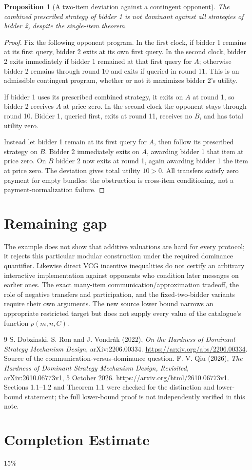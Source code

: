 \documentclass[11pt]{article}
\newtheorem{proposition}[theorem]{Proposition}
\theoremstyle{definition}
\theoremstyle{remark}
\begin{document}
\begin{proposition}[A two-item deviation against a contingent opponent]
The combined prescribed strategy of bidder 1 is not dominant against all strategies of bidder 2, despite the single-item theorem.
\end{proposition}
\begin{proof}
Fix the following opponent program. In the first clock, if bidder 1 remains at its first query, bidder 2 exits at its own first query. In the second clock, bidder 2 exits immediately if bidder 1 remained at that first query for $A$; otherwise bidder 2 remains through round 10 and exits if queried in round 11. This is an admissible contingent program, whether or not it maximizes bidder 2's utility.

If bidder 1 uses its prescribed combined strategy, it exits on $A$ at round 1, so bidder 2 receives $A$ at price zero. In the second clock the opponent stays through round 10. Bidder 1, queried first, exits at round 11, receives no $B$, and has total utility zero.

Instead let bidder 1 remain at its first query for $A$, then follow its prescribed strategy on $B$. Bidder 2 immediately exits on $A$, awarding bidder 1 that item at price zero. On $B$ bidder 2 now exits at round 1, again awarding bidder 1 the item at price zero. The deviation gives total utility $10>0$. All transfers satisfy zero payment for empty bundles; the obstruction is cross-item conditioning, not a payment-normalization failure.
\end{proof}

\section{Remaining gap}
The example does not show that additive valuations are hard for every protocol; it rejects this particular modular construction under the required dominance quantifier. Likewise direct VCG incentive inequalities do not certify an arbitrary interactive implementation against opponents who condition later messages on earlier ones. The exact many-item communication/approximation tradeoff, the role of negative transfers and participation, and the fixed-two-bidder variants require their own arguments. The new source lower bound narrows an appropriate restricted target but does not supply every value of the catalogue's function $\rho(m,n,C)$.

\begin{thebibliography}{9}
 S. Dobzinski, S. Ron and J. Vondr\'ak (2022), \emph{On the Hardness of Dominant Strategy Mechanism Design}, arXiv:2206.00334. \url{https://arxiv.org/abs/2206.00334}. Source of the communication-versus-dominance question.
 F. V. Qiu (2026), \emph{The Hardness of Dominant Strategy Mechanism Design, Revisited}, arXiv:2610.06773v1, 5 October 2026. \url{https://arxiv.org/html/2610.06773v1}. Sections 1.1--1.2 and Theorem 1.1 were checked for the distinction and lower-bound statement; the full lower-bound proof is not independently verified in this note.
\end{thebibliography}
\section{Completion Estimate}
15\%
\end{document}
